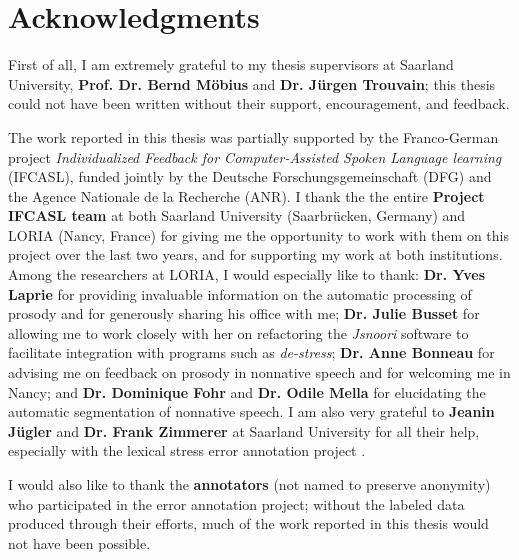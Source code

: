 %
\chapter*{Acknowledgments}
\label{sec:thanks}
\vspace*{-10mm}


First of all, I am extremely grateful to my thesis supervisors at Saarland University, \textbf{Prof. Dr. Bernd Möbius} and \textbf{Dr. Jürgen Trouvain}; this thesis could not have been written without their support, encouragement, and feedback.

The work reported in this thesis was partially supported by the Franco-German project \textit{Individualized Feedback for Computer-Assisted Spoken Language learning} (IFCASL), funded jointly by the Deutsche Forschungsgemeinschaft (DFG) and the Agence Nationale de la Recherche (ANR). I thank the the entire \textbf{Project IFCASL team} at both Saarland University (Saarbrücken, Germany) and LORIA (Nancy, France) for giving me the opportunity to work with them on this project over the last two years, and for supporting my work at both institutions.
%
Among the researchers at LORIA, I would especially like to thank:
\textbf{Dr. Yves Laprie} for providing invaluable information on the automatic processing of prosody and for generously sharing his office with me;
\textbf{Dr. Julie Busset} for allowing me to work closely with her on refactoring the \textit{Jsnoori} software to facilitate integration with programs such as \textit{de-stress};
\textbf{Dr. Anne Bonneau} for advising me on feedback on prosody in nonnative speech and for welcoming me in Nancy;
and 
\textbf{Dr. Dominique Fohr} and \textbf{Dr. Odile Mella} for elucidating the automatic segmentation of nonnative speech. 
%
I am also very grateful to \textbf{Jeanin Jügler} and \textbf{Dr. Frank Zimmerer} at Saarland University for all their help, especially with the lexical stress error annotation project . 

I would also like to thank the \textbf{annotators} (not named to preserve anonymity) who participated in the error annotation project; without the labeled data produced through their efforts, much of the work reported in this thesis would not have been possible.

